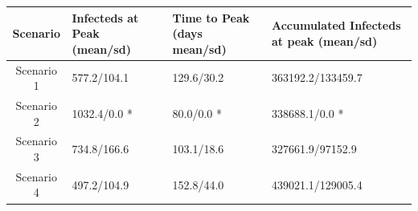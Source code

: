 \documentclass[10pt,a4paper]{article}
\begin{document}


\begin{center}
    \begin{tabular}{| c | p{3cm} | p{3cm}| p{3cm} |}
    \hline
    Scenario & Infecteds at Peak (mean/sd)& Time to Peak (days mean/sd) & Accumulated Infecteds at peak (mean/sd) \\ \hline
    Scenario 1 & 577.2/104.1  & 129.6/30.2 & 363192.2/133459.7 \\ \hline
    Scenario 2 & 1032.4/0.0 * & 80.0/0.0 *  & 338688.1/0.0 * \\ \hline
    Scenario 3 & 734.8/166.6 & 103.1/18.6 & 327661.9/97152.9 \\ \hline
    Scenario 4 & 497.2/104.9 & 152.8/44.0 & 439021.1/129005.4 \\ 
    
    \hline
    \end{tabular}
\end{center}

%
\end{document}
